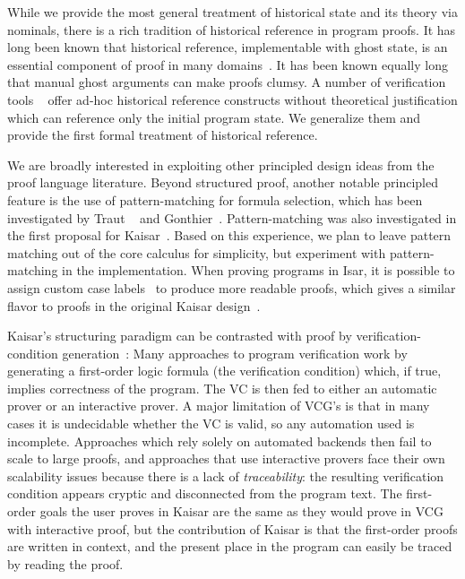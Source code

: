 \documentclass[12pt]{cmuthesis}
\theoremstyle{definition}
\theoremstyle{remark}
\begin{document}
While we provide the most general treatment of historical state and its theory via nominals, there is a rich tradition of historical reference in program proofs.
It has long been known that historical reference, implementable with ghost state, is an essential component of proof in many domains~\cite{DBLP:journals/tcs/AptBM79,Owicki1976,DBLP:books/garland/Owicki75,apt2010verification,DBLP:journals/acta/Clint73}.
It has been known equally long~\cite{DBLP:journals/acta/Clarke80} that manual ghost arguments can make proofs clumsy.
A number of verification tools ~\cite{KeYBook,DBLP:conf/cade/FultonMQVP15,DBLP:conf/lpar/Leino10,this-is-boogie-2-2,Barnett2005,DBLP:conf/fosad/LeinoMS09,DBLP:books/daglib/p/LeavensBR99,DBLP:journals/fac/Kleymann99} offer ad-hoc historical reference constructs without theoretical justification which can reference only the initial program state.
We generalize them and provide the first formal treatment of historical reference.


We are broadly interested in exploiting other principled design ideas from the proof language literature.
Beyond structured proof, another notable principled feature is the use of pattern-matching for formula selection, which has been investigated by Traut ~\cite{traut2014pattern} and Gonthier~\cite{DBLP:conf/itp/GonthierT12,noschinskipattern}.
Pattern-matching was also investigated in the first proposal for Kaisar~\cite{DBLP:journals/corr/abs-1908-05535}.
Based on this experience, we plan to leave pattern matching out of the core calculus for simplicity, but experiment with pattern-matching in the implementation.
When proving programs in Isar, it is possible to assign custom case labels~\cite{DBLP:journals/afp/Noschinski15} to produce more readable proofs, which gives a similar flavor to proofs in the original Kaisar design~\cite{DBLP:journals/corr/abs-1908-05535}.

Kaisar's structuring paradigm can be contrasted with proof by verification-condition generation~\cite{DBLP:conf/ifip/King71}: Many approaches to program verification work by generating a first-order logic formula (the verification condition) which, if true, implies correctness of the program.
The VC is then fed to either an automatic prover or an interactive prover.
A major limitation of VCG's is that in many cases it is undecidable whether the VC is valid, so any automation used is incomplete.
Approaches which rely solely on automated backends then fail to scale to large proofs, and approaches that use interactive provers face their own scalability issues because there is a lack of \emph{traceability}: the resulting verification condition appears cryptic and disconnected from the program text.
The first-order goals the user proves in Kaisar are the same as they would prove in VCG with interactive proof, but the contribution of Kaisar is that the first-order proofs are written in context, and the present place in the program can easily be traced by reading the proof.
\end{document}
